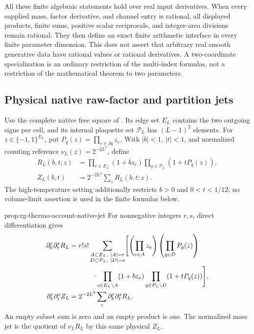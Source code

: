 All these finite algebraic statements hold over real input derivatives.
When every supplied mass, factor derivative, and channel entry is rational,
all displayed products, finite sums, positive scalar reciprocals, and
integer-area divisions remain rational. They then define an exact finite
arithmetic interface in every finite parameter dimension. This does not
assert that arbitrary real smooth generative data have rational values or
rational derivatives. A two-coordinate specialization is an ordinary
restriction of the multi-index formulas, not a restriction of the
mathematical theorem to two parameters.\thermoestablishedstatus


\subsection{Physical native raw-factor and partition jets}
\label{sec:rg-thermo-account-native-jets}

Use the complete native free square of
. Its edge set $E_L$ contains the two
outgoing signs per cell, and its internal plaquette set
$\mathcal P_L$ has $(L-1)^2$ elements. For
$z\in\{-1,1\}^{E_L}$, put $P_q(z)=\prod_{e\in\partial q}z_e$.
With $|b|<1$, $|t|<1$, and normalized counting reference
$\nu_L(z)=2^{-2L^2}$, define
\begin{equation}
 \begin{aligned}
 R_L(b,t;z)&=\prod_{e\in E_L}(1+bz_e)
                  \prod_{q\in\mathcal P_L}(1+tP_q(z)),\\
 Z_L(b,t)&=2^{-2L^2}\sum_zR_L(b,t;z).
 \end{aligned}
 \label{eq:rg-thermo-account-native-raw}
\end{equation}
The high-temperature setting additionally restricts $b>0$ and
$0<t<1/12$; no volume-limit assertion is used in the finite formulas
below.\thermodeclareddefinition


{prop:rg-thermo-account-native-jet}
For nonnegative integers $r,s$, direct differentiation gives
\begin{align}
 \partial_b^r\partial_t^sR_L
 ={}&r!s!\sum_{\substack{A\subset E_L,\ |A|=r\\
                         D\subset\mathcal P_L,\ |D|=s}}
 \Biggl[\left(\prod_{e\in A}z_e\right)
 \left(\prod_{q\in D}P_q(z)\right)\notag\\
 &\qquad\cdot\prod_{e\in E_L\setminus A}(1+bz_e)
 \prod_{q\in\mathcal P_L\setminus D}(1+tP_q(z))\Biggr],
 \label{eq:rg-thermo-account-native-derivatives}\\
 \partial_b^r\partial_t^s Z_L
 ={}&2^{-2L^2}\sum_z\partial_b^r\partial_t^sR_L.
 \label{eq:rg-thermo-account-native-partition-derivatives}
\end{align}
An empty subset sum is zero and an empty product is one. The normalized
mass jet is the quotient of $\nu_LR_L$ by this same physical $Z_L$.\thermoestablishedstatus


